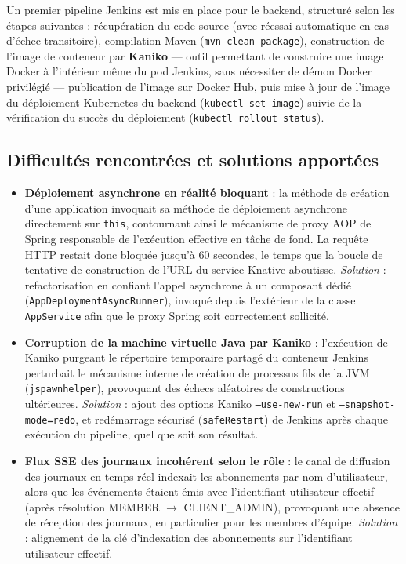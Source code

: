 Un premier pipeline Jenkins est mis en place pour le backend, structuré selon les étapes suivantes : récupération du code source (avec réessai automatique en cas d'échec transitoire), compilation Maven (\texttt{mvn clean package}), construction de l'image de conteneur par \textbf{Kaniko} — outil permettant de construire une image Docker à l'intérieur même du pod Jenkins, sans nécessiter de démon Docker privilégié — publication de l'image sur Docker Hub, puis mise à jour de l'image du déploiement Kubernetes du backend (\texttt{kubectl set image}) suivie de la vérification du succès du déploiement (\texttt{kubectl rollout status}).

\subsection{Difficultés rencontrées et solutions apportées}

\begin{itemize}
    \item \textbf{Déploiement \og asynchrone \fg{} en réalité bloquant} : la méthode de création d'une application invoquait sa méthode de déploiement asynchrone directement sur \texttt{this}, contournant ainsi le mécanisme de proxy AOP de Spring responsable de l'exécution effective en tâche de fond. La requête HTTP restait donc bloquée jusqu'à 60 secondes, le temps que la boucle de tentative de construction de l'URL du service Knative aboutisse. \textit{Solution} : refactorisation en confiant l'appel asynchrone à un composant dédié (\texttt{AppDeploymentAsyncRunner}), invoqué depuis l'extérieur de la classe \texttt{AppService} afin que le proxy Spring soit correctement sollicité.
    \item \textbf{Corruption de la machine virtuelle Java par Kaniko} : l'exécution de Kaniko purgeant le répertoire temporaire partagé du conteneur Jenkins perturbait le mécanisme interne de création de processus fils de la JVM (\texttt{jspawnhelper}), provoquant des échecs aléatoires de constructions ultérieures. \textit{Solution} : ajout des options Kaniko \texttt{--use-new-run} et \texttt{--snapshot-mode=redo}, et redémarrage sécurisé (\texttt{safeRestart}) de Jenkins après chaque exécution du pipeline, quel que soit son résultat.
    \item \textbf{Flux SSE des journaux incohérent selon le rôle} : le canal de diffusion des journaux en temps réel indexait les abonnements par nom d'utilisateur, alors que les événements étaient émis avec l'identifiant utilisateur effectif (après résolution MEMBER $\rightarrow$ CLIENT\_ADMIN), provoquant une absence de réception des journaux, en particulier pour les membres d'équipe. \textit{Solution} : alignement de la clé d'indexation des abonnements sur l'identifiant utilisateur effectif.
\end{itemize}

